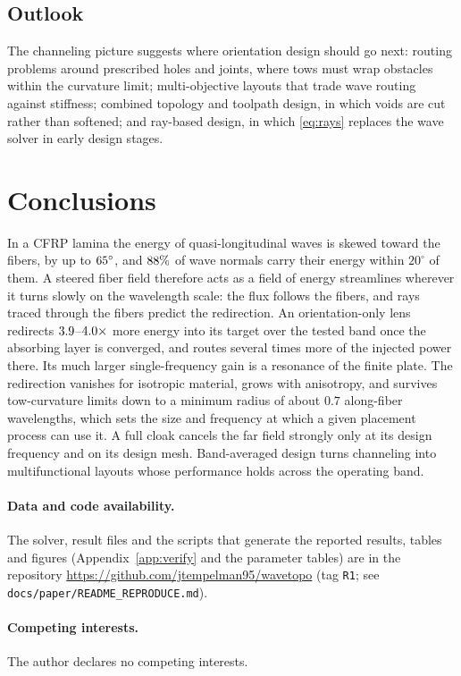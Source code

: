 \subsection{Outlook}
The channeling picture suggests where orientation design should go next: routing problems around
prescribed holes and joints, where tows must wrap obstacles within the curvature limit; multi-objective
layouts that trade wave routing against stiffness; combined topology and toolpath design, in which voids are
cut rather than softened; and ray-based design, in which \eqref{eq:rays} replaces the wave solver in early
design stages.

\section{Conclusions}\label{sec:conclusion}
In a CFRP lamina the energy of quasi-longitudinal waves is skewed toward the fibers, by up to
$65^\circ$, and $88\%$ of wave normals carry their energy within $20^\circ$ of them. A steered fiber
field therefore acts as a field of energy streamlines wherever it turns slowly on the wavelength scale: the
flux follows the fibers, and rays traced through the fibers predict the redirection. An orientation-only lens
redirects $3.9$--$4.0\times$ more energy into its target over the tested band once the absorbing
layer is converged, and routes several times more of the injected power there. Its much larger
single-frequency gain is a resonance of the finite plate. The redirection vanishes for isotropic material,
grows with anisotropy, and survives tow-curvature limits down to a minimum radius of about $0.7$ along-fiber
wavelengths, which sets the size and frequency at which a given placement process can use it. A full cloak
cancels the far field strongly only at its design frequency and on its design mesh. Band-averaged design turns
channeling into multifunctional layouts whose performance holds across the operating band.

\paragraph{Data and code availability.} The solver, result files and the scripts that generate the reported
results, tables and figures (Appendix~\ref{app:verify} and the parameter tables) are in the repository
\url{https://github.com/jtempelman95/wavetopo} (tag \texttt{R1}; see \texttt{docs/paper/README\_REPRODUCE.md}).

\paragraph{Competing interests.} The author declares no competing interests.
